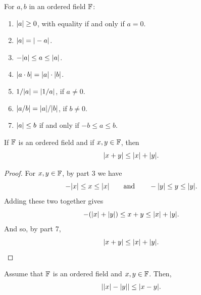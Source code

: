 \documentclass[11pt,twoside=off,numbers=noenddot]{scrbook}
\begin{document}
\begin{fact}
  For $a, b$ in an ordered field $\mathbb F$:
  \begin{enumerate}
    \item $| a | \geq 0$, with equality if and only if $a = 0$.
    \item $| a | = | -a |$.
    \item $-| a | \leq a \leq | a |$.
    \item $| a \cdot b | = | a | \cdot | b |$.
    \item $1/| a | = | 1/a |$, if $a \neq 0$.
    \item $| a/b | = | a |/| b |$, if $b \neq 0$.
    \item $| a | \leq b$ if and only if $-b \leq a \leq b$.
  \end{enumerate}
\end{fact}

\begin{theorem}
  If $\mathbb F$ is an ordered field and if $x, y \in \mathbb F$, then
  \[ | x + y | \leq | x | + | y |. \]
\end{theorem}

\begin{proof}
  For $x, y \in \mathbb F$, by  part 3 we have
  \[ -| x | \leq x \leq | x | \qquad \text{and} \qquad -| y |
  \leq y \leq | y |. \]
  Adding these two together gives
  \[ -(| x | + | y |) \leq x + y \leq | x | + | y |. \]
  And so, by  part 7,
  \[ | x + y | \leq | x | + | y |. \]
\end{proof}

\begin{corollary}
  Assume that $\mathbb F$ is an ordered field and $x, y \in \mathbb F$. Then,
  \begin{align*}
    | | x | - | y | | \leq | x - y |.
  \end{align*}
\end{corollary}
\end{document}
